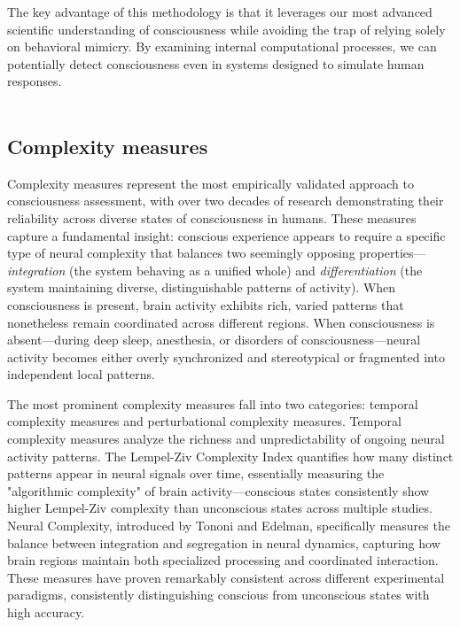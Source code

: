 \documentclass[11pt,a4paper]{article}
\begin{document}
The key advantage of this methodology is that it leverages our most advanced scientific understanding of consciousness while avoiding the trap of relying solely on behavioral mimicry. By examining internal computational processes, we can potentially detect consciousness even in systems designed to simulate human responses.
\\
\\
\label{sec:background}

\subsection{Complexity measures}

Complexity measures represent the most empirically validated approach to consciousness assessment, with over two decades of research demonstrating their reliability across diverse states of consciousness in humans. These measures capture a fundamental insight: conscious experience appears to require a specific type of neural complexity that balances two seemingly opposing properties—\textit{integration} (the system behaving as a unified whole) and \textit{differentiation} (the system maintaining diverse, distinguishable patterns of activity). When consciousness is present, brain activity exhibits rich, varied patterns that nonetheless remain coordinated across different regions. When consciousness is absent—during deep sleep, anesthesia, or disorders of consciousness—neural activity becomes either overly synchronized and stereotypical or fragmented into independent local patterns.

The most prominent complexity measures fall into two categories: temporal complexity measures and perturbational complexity measures. Temporal complexity measures analyze the richness and unpredictability of ongoing neural activity patterns. The Lempel-Ziv Complexity Index quantifies how many distinct patterns appear in neural signals over time, essentially measuring the "algorithmic complexity" of brain activity—conscious states consistently show higher Lempel-Ziv complexity than unconscious states across multiple studies. Neural Complexity, introduced by Tononi and Edelman, specifically measures the balance between integration and segregation in neural dynamics, capturing how brain regions maintain both specialized processing and coordinated interaction. These measures have proven remarkably consistent across different experimental paradigms, consistently distinguishing conscious from unconscious states with high accuracy.
\end{document}
